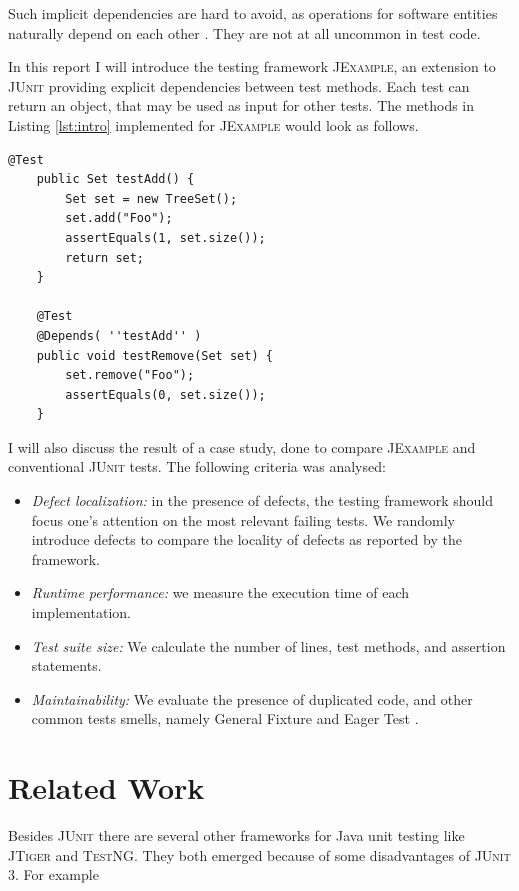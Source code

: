 \documentclass[11pt,a4paper,pdftex]{article}
\newcommand{\JUnit}{\textsc{JUnit}\xspace}
\newcommand{\JExample}{\textsc{JExample}\xspace}
\newcommand{\TestNG}{\textsc{TestNG}\xspace}
\newcommand{\JTiger}{\textsc{JTiger}\xspace}
\begin{document}
Such implicit dependencies are hard to avoid, as operations for software entities naturally depend on each other \cite{Fews99a, Mesz07a, Deur01a}. They are not at all uncommon in test code.

In this report I will introduce the testing framework \JExample, an extension to \JUnit providing explicit dependencies between test methods.
Each test can return an object, that may be used as input for other tests.
The methods in Listing \ref{lst:intro} implemented for \JExample would look as follows.

\begin{lstlisting}[label=lst:introDep,caption=Explicit dependency between test methods in \JExample.]
    @Test
    public Set testAdd() {
    	Set set = new TreeSet();
        set.add("Foo");
        assertEquals(1, set.size());
        return set;
    }

    @Test
    @Depends( ''testAdd'' )
    public void testRemove(Set set) {
        set.remove("Foo");
        assertEquals(0, set.size());
    }
\end{lstlisting}

I will also discuss the result of a case study, done to compare \JExample and conventional \JUnit tests. The following criteria was analysed:
\begin{itemize}
\item \emph{Defect localization:} in the presence of defects, the testing framework should focus one's attention on the most relevant failing tests. We randomly introduce defects to compare the locality of defects as reported by the framework.
\item \emph{Runtime performance:} we measure the execution time of each implementation.
\item \emph{Test suite size:} We calculate the number of lines, test methods, and assertion statements.
\item \emph{Maintainability:} We evaluate the presence of duplicated code, and other common tests smells, namely General Fixture and Eager Test \cite{Deur01a}.
\end{itemize}
 
\section{Related Work}

Besides \JUnit there are several other frameworks for Java unit testing like \JTiger and \TestNG. They both emerged because of some disadvantages of \JUnit 3. For example
\end{document}
